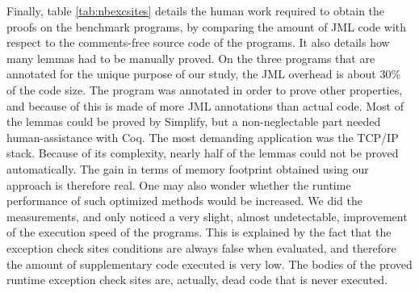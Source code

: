 Finally, table \ref{tab:nbexcsites} details the human work required to obtain the proofs on the benchmark programs, by comparing the amount of JML code with respect to the comments-free source code of the programs. It also details how many lemmas had to be manually proved.
On the three programs that are annotated for the unique purpose of our
study, the JML overhead is about 30\% of the code size. The
 program was annotated in order to prove other
properties, and because of this is made of more JML annotations than
actual code. Most of the lemmas could be proved by Simplify, but a
non-neglectable part needed human-assistance with Coq. The most
demanding application was the TCP/IP stack. Because of its complexity,
nearly half of the lemmas could not be proved automatically.
The gain in terms of memory footprint obtained using our approach is
therefore real. One may also wonder whether the runtime performance of
such optimized methods would be increased. We did the measurements,
and only noticed a very slight, almost undetectable, improvement of
the execution speed of the programs. This is explained by the fact
that the exception check sites conditions are always false when
evaluated, and therefore the amount of supplementary code executed is
very low. The bodies of the proved runtime exception check sites are,
actually, dead code that is never executed.



